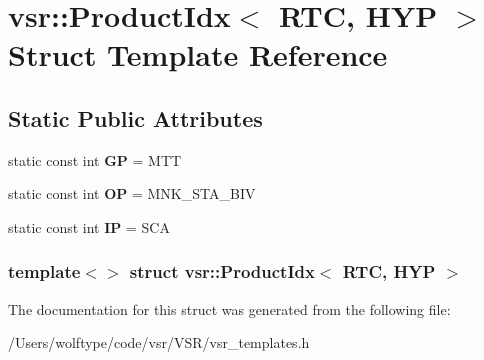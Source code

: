\hypertarget{structvsr_1_1_product_idx_3_01_r_t_c_00_01_h_y_p_01_4}{\section{vsr\-:\-:Product\-Idx$<$ R\-T\-C, H\-Y\-P $>$ Struct Template Reference}
\label{structvsr_1_1_product_idx_3_01_r_t_c_00_01_h_y_p_01_4}
}
\subsection*{Static Public Attributes}
\begin{DoxyCompactItemize}
\item 
\hypertarget{structvsr_1_1_product_idx_3_01_r_t_c_00_01_h_y_p_01_4_a42f6b59a3c556da12a0033b28a462424}{static const int {\bfseries G\-P} = M\-T\-T}\label{structvsr_1_1_product_idx_3_01_r_t_c_00_01_h_y_p_01_4_a42f6b59a3c556da12a0033b28a462424}

\item 
\hypertarget{structvsr_1_1_product_idx_3_01_r_t_c_00_01_h_y_p_01_4_a7beaafd21666e8d0d2f43edae6a244ca}{static const int {\bfseries O\-P} = M\-N\-K\-\_\-\-S\-T\-A\-\_\-\-B\-I\-V}\label{structvsr_1_1_product_idx_3_01_r_t_c_00_01_h_y_p_01_4_a7beaafd21666e8d0d2f43edae6a244ca}

\item 
\hypertarget{structvsr_1_1_product_idx_3_01_r_t_c_00_01_h_y_p_01_4_aea1da01a6040b58001337933dcd3b382}{static const int {\bfseries I\-P} = S\-C\-A}\label{structvsr_1_1_product_idx_3_01_r_t_c_00_01_h_y_p_01_4_aea1da01a6040b58001337933dcd3b382}

\end{DoxyCompactItemize}
\subsubsection*{template$<$$>$ struct vsr\-::\-Product\-Idx$<$ R\-T\-C, H\-Y\-P $>$}



The documentation for this struct was generated from the following file\-:\begin{DoxyCompactItemize}
\item 
/\-Users/wolftype/code/vsr/\-V\-S\-R/vsr\-\_\-templates.\-h\end{DoxyCompactItemize}
